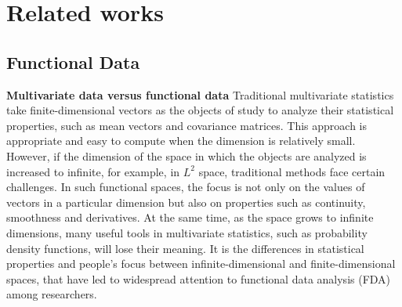 \documentclass{article}
\begin{document}
\section{Related works}

\subsection{Functional Data}

\textbf{Multivariate data versus functional data} 
Traditional multivariate statistics take finite-dimensional vectors as the objects of study to analyze their statistical properties, such as mean vectors and covariance matrices. 
This approach is appropriate and easy to compute when the dimension is relatively small. 
However, if the dimension of the space in which the objects are analyzed is increased to infinite, for example, in $L^2$ space, traditional methods face certain challenges. 
In such functional spaces, the focus is not only on the values of vectors in a particular dimension but also on properties such as continuity, smoothness and derivatives. 
At the same time, as the space grows to infinite dimensions, many useful tools in multivariate statistics, such as probability density functions, will lose their meaning. 
It is the differences in statistical properties and people's focus between infinite-dimensional and finite-dimensional spaces, that have led to widespread attention to functional data analysis (FDA) among researchers.
\end{document}
